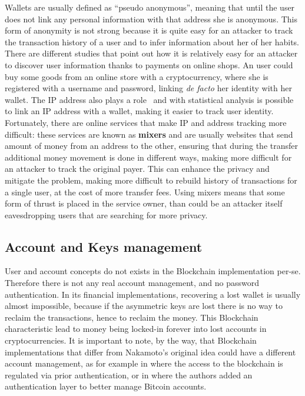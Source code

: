Wallets are usually defined as ``pseudo anonymous'', meaning that until the
user does not link any personal information with that address she is anonymous.
This form of anonymity is not strong because it is quite easy for an attacker to
track the transaction history of a user and to infer information about her of
her habits.
There are different studies \cite{guadamuz15} that point out how it is
relatively easy for an attacker to discover user information thanks
to payments on online shops. An user could buy some goods from an online store
with a cryptocurrency, where she is registered with a username and password,
linking \textit{de facto} her identity with her wallet.
The IP address also plays a role~\cite{koshy14} and with statistical analysis
is possible to link an IP address with a wallet, making it easier to track user
identity.
Fortunately, there are online services that make IP and address tracking more
difficult: these services are known as \textbf{mixers} and are usually websites
that send amount of money from an address to the other, ensuring that during the
transfer additional money movement is done in different ways, making more
difficult for an attacker to track the original payer. This can enhance the
privacy and mitigate the problem, making more difficult to rebuild history of
transactions for a single user, at the cost of more transfer fees. Using mixers
means that some form of thrust is placed in the service owner, than could be an
attacker itself eavesdropping users that are searching for more privacy.

\subsection{Account and Keys management}

User and account concepts do not exists in the Blockchain implementation per-se.
Therefore there is not any real account management, and no password
authentication. In its financial implementations, recovering a lost wallet is
usually almost impossible, because if the asymmetric keys are lost there is no
way to reclaim the transactions, hence to reclaim the money. This Blockchain
characteristic lead to money being locked-in forever into lost accounts in
cryptocurrencies.
It is important to note, by the way, that Blockchain implementations that differ
from Nakamoto's original idea could have a different account management, as for
example in\cite{azaria16} where the access to the blockchain is regulated via
prior authentication, or in\cite{zhou16} where the authors added an
authentication layer to better manage Bitcoin accounts.

